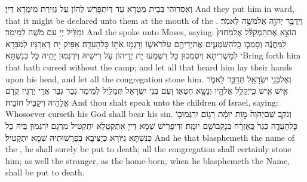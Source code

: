 {וְאַסְרוּהִי בְּבֵית מַטְּרָא עַד דְּיִתְפָּרַשׁ לְהוֹן עַל גְּזֵירַת מֵימְרָא דַּייָ׃}
{And they put him in ward, that it might be declared unto them at the mouth of the \lord.}{}
{וַיְדַבֵּ֥ר יְהֹוָ֖ה אֶל\maqqaf מֹשֶׁ֥ה לֵּאמֹֽר׃}
{וּמַלֵּיל יְיָ עִם מֹשֶׁה לְמֵימַר׃}
{And the \lord\space spoke unto Moses, saying:}{}
{הוֹצֵ֣א אֶת\maqqaf הַֽמְקַלֵּ֗ל אֶל\maqqaf מִחוּץ֙ לַֽמַּחֲנֶ֔ה וְסָמְכ֧וּ כׇֽל\maqqaf הַשֹּׁמְעִ֛ים אֶת\maqqaf יְדֵיהֶ֖ם עַל\maqqaf רֹאשׁ֑וֹ וְרָגְמ֥וּ אֹת֖וֹ כׇּל\maqqaf הָעֵדָֽה׃}
{אַפֵּיק יָת דְּאַרְגֵּיז לְמִבַּרָא לְמַשְׁרִיתָא וְיִסְמְכוּן כָּל דִּשְׁמַעוּ יָת יְדֵיהוֹן עַל רֵישֵׁיהּ וְיִרְגְּמוּן יָתֵיהּ כָּל כְּנִשְׁתָּא׃}
{‘Bring forth him that hath cursed without the camp; and let all that heard him lay their hands upon his head, and let all the congregation stone him.}{}
{וְאֶל\maqqaf בְּנֵ֥י יִשְׂרָאֵ֖ל תְּדַבֵּ֣ר לֵאמֹ֑ר אִ֥ישׁ אִ֛ישׁ כִּֽי\maqqaf יְקַלֵּ֥ל אֱלֹהָ֖יו וְנָשָׂ֥א חֶטְאֽוֹ׃}
{וְעִם בְּנֵי יִשְׂרָאֵל תְּמַלֵּיל לְמֵימַר גְּבַר גְּבַר אֲרֵי יַרְגֵּיז קֳדָם אֱלָהֵיהּ וִיקַבֵּיל חוֹבֵיהּ׃}
{And thou shalt speak unto the children of Israel, saying: Whosoever curseth his God shall bear his sin.}{}
{וְנֹקֵ֤ב שֵׁם\maqqaf יְהֹוָה֙ מ֣וֹת יוּמָ֔ת רָג֥וֹם יִרְגְּמוּ\maqqaf ב֖וֹ כׇּל\maqqaf הָעֵדָ֑ה כַּגֵּר֙ כָּֽאֶזְרָ֔ח בְּנׇקְבוֹ\maqqaf שֵׁ֖ם יוּמָֽת׃}
{וְדִיפָרֵישׁ שְׁמָא דַּייָ אִתְקְטָלָא יִתְקְטִיל מִרְגָּם יִרְגְּמוּן בֵּיהּ כָּל כְּנִשְׁתָּא גִּיּוֹרָא כְּיַצִּיבָא בְּפָרָשׁוּתֵיהּ שְׁמָא יִתְקְטִיל׃}
{And he that blasphemeth the name of the \lord, he shall surely be put to death; all the congregation shall certainly stone him; as well the stranger, as the home-born, when he blasphemeth the Name, shall be put to death.}{}
